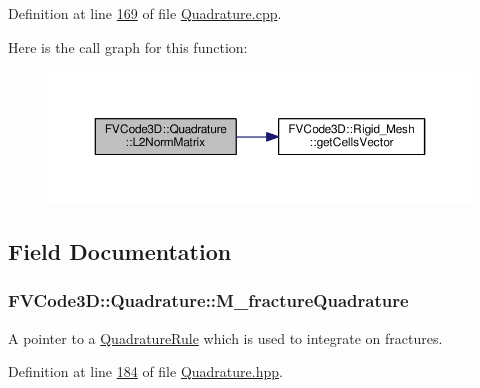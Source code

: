 Definition at line \hyperlink{Quadrature_8cpp_source_l00169}{169} of file \hyperlink{Quadrature_8cpp_source}{Quadrature.\+cpp}.



Here is the call graph for this function\+:
\nopagebreak
\begin{figure}[H]
\begin{center}
\leavevmode
\includegraphics[width=350pt]{classFVCode3D_1_1Quadrature_a94672e9671bb0bf9cf2e89951fd9535d_cgraph}
\end{center}
\end{figure}




\subsection{Field Documentation}
\subsubsection[{\texorpdfstring{M\+\_\+fracture\+Quadrature}{M_fractureQuadrature}}]{ F\+V\+Code3\+D\+::\+Quadrature\+::\+M\+\_\+fracture\+Quadrature\hspace{0.3cm}{\ttfamily [protected]}}\hypertarget{classFVCode3D_1_1Quadrature_afc75e45ee2a0a8be3cd39f93c2ef0b7e}{}\label{classFVCode3D_1_1Quadrature_afc75e45ee2a0a8be3cd39f93c2ef0b7e}


A pointer to a \hyperlink{classFVCode3D_1_1QuadratureRule}{Quadrature\+Rule} which is used to integrate on fractures. 



Definition at line \hyperlink{Quadrature_8hpp_source_l00184}{184} of file \hyperlink{Quadrature_8hpp_source}{Quadrature.\+hpp}.

